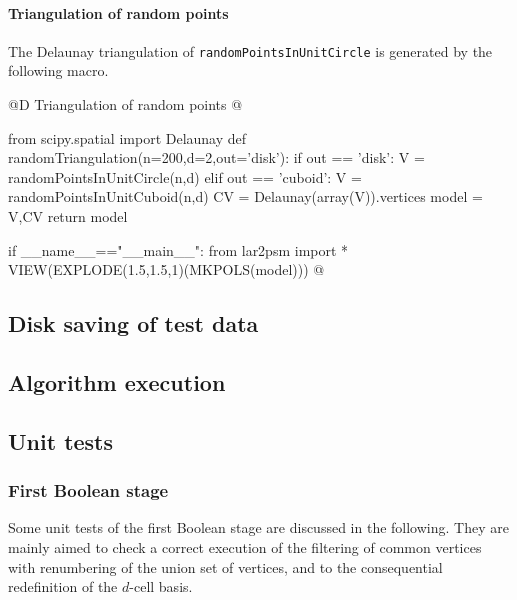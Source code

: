 \documentclass[11pt,oneside]{article}	%
\begin{document}
\paragraph{Triangulation of random points} The Delaunay triangulation of \texttt{randomPointsInUnitCircle} is generated by the following macro.


@D Triangulation of random points
@{from scipy.spatial import Delaunay
def randomTriangulation(n=200,d=2,out='disk'):
	if out == 'disk':
		V = randomPointsInUnitCircle(n,d)
	elif out == 'cuboid':
		V = randomPointsInUnitCuboid(n,d)
	CV = Delaunay(array(V)).vertices
	model = V,CV
	return model

if __name__=="__main__":
	from lar2psm import *
	VIEW(EXPLODE(1.5,1.5,1)(MKPOLS(model)))
@}

\subsection{Disk saving of test data}
\subsection{Algorithm execution}
\subsection{Unit tests}

\subsubsection{First Boolean stage}

Some unit tests of the first Boolean stage are discussed in the following. They are mainly aimed to check a correct execution of the filtering of common vertices with renumbering of the union set of vertices, and to the consequential redefinition of the $d$-cell basis.
\end{document}
